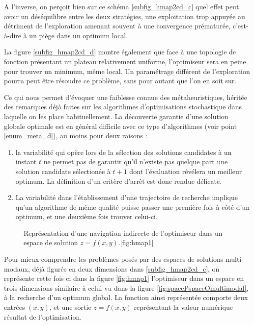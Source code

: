 A l'inverse, on perçoit bien sur ce schéma \ref{subfig_hmap2cd_c} quel effet peut avoir un déséquilibre entre les deux stratégies, une exploitation trop appuyée au détriment de l'exploration amenant souvent à une convergence prématurée, c'est-à-dire à un piège dans un optimum local.

La figure \ref{subfig_hmap2cd_d} montre également que face à une topologie de fonction présentant un plateau relativement uniforme, l'optimiseur sera en peine pour trouver un minimum, même local. Un paramétrage différent de l'exploration pourra peut être résoudre ce problème, sans pour autant que l'on en soit sur.

Ce qui nous permet d'évoquer une faiblesse connue des métaheuristiques, héritée des remarques déjà faites sur les algorithmes d'optimisations stochastique dans laquelle on les place habituellement. La découverte garantie d'une solution globale optimale est en général difficile avec ce type d'algorithmes (voir point \ref{enum_meta_d}), au moins pour deux raisons :

\begin{enumerate}
\item la variabilité qui opère lors de la sélection des solutions candidates à un instant $t$ ne permet pas de garantir qu'il n'existe pas quelque part une solution candidate sélectionée à $t+1$ dont l'évaluation révélera un meilleur optimum. La définition d'un critère d'arrêt est donc rendue délicate.
\item La variabilité dans l'établissement d'une trajectoire de recherche implique qu'un algorithme de même qualité puisse passer une première fois à côté d'un optimum, et une deuxième fois trouver celui-ci.
\end{enumerate}

\begin{figure}[!htbp]
\begin{sidecaption}{Représentation d'une navigation indirecte de l'optimiseur dans un espace de solution $z = f(x,y)$.}[fig:hmap1]
  \centering
  \qquad
\end{sidecaption}
\end{figure}

Pour mieux comprendre les problèmes posés par des espaces de solutions multi-modaux, déjà figurés en deux dimensions dans \ref{subfig_hmap2cd_c}, on représente cette fois ci dans la figure \ref{fig:hmap1} l'optimiseur dans un espace en trois dimensions similaire à celui vu dans la figure \ref{fig:spacePspaceOmultimodal}, à la recherche d'un optimum global. La fonction ainsi représentée comporte deux entrées $(x,y)$, et une sortie $z = f(x,y)$ représentant la valeur numérique résultat de l'optimisation.

